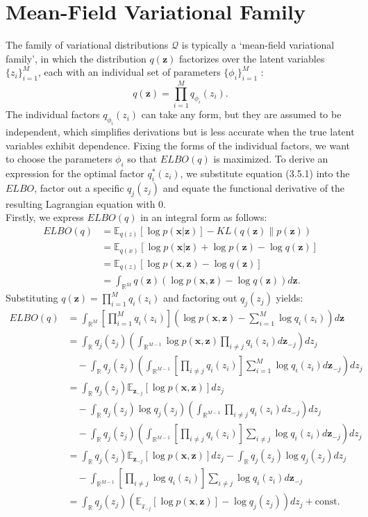 \documentclass[honours,12pt]{unswthesis}
\newcommand{\R}{\mathbb{R}}
\numberwithin{equation}{section}
\theoremstyle{definition}
\begin{document}
\section{Mean-Field Variational Family}
The family of variational distributions $\mathcal{Q}$ is typically a `mean-field variational family', in which the distribution $q(\bm{z})$ factorizes over the latent variables $\{z_i\}^M_{i=1}$, each with an individual set of parameters $\{\phi_i\}^M_{i=1}$ \citep{blei}:
\begin{equation}
q(\bm{z})=\prod^M_{i=1}q_{\phi_i}(z_i).
\end{equation}
The individual factors $q_{\phi_i}(z_i)$ can take any form, but they are assumed to be independent, which simplifies derivations but is less accurate when the true latent variables exhibit dependence. Fixing the forms of the individual factors, we want to choose the parameters $\phi_i$ so that $ELBO(q)$ is maximized. To derive an expression for the optimal factor $q_i^*(z_i)$, we substitute equation (3.5.1) into the $ELBO$, factor out a specific $q_j(z_j)$ and equate the functional derivative of the resulting Lagrangian equation with 0. \\
Firstly, we express $ELBO(q)$ in an integral form as follows:
\begin{align*}
ELBO(q)&= \mathbb{E}_{q(z)}[\log p(\bm{x}|\bm{z})]-KL(q(\bm{z})\|p(\bm{z}))\\
&= \mathbb{E}_{q(x)}[\log p(\bm{x}|\bm{z})+\log p(\bm{z})-\log q(\bm{z})]\\
&= \mathbb{E}_{q(z)}[\log p(\bm{x}, \bm{z})-\log q(\bm{z})]\\
&= \int_{\R^M}q(\bm{z})(\log p(\bm{x},\bm{z})-\log q(\bm{z}))d\bm{z}.
\end{align*}
Substituting $q(\bm{z})=\prod^M_{i=1}q_i(z_i)$ and factoring out $q_j(z_j)$ yields:
\begin{align}
ELBO(q)&= \int_{\R^M}\left[\prod^M_{i=1}q_i(z_i)\right]\left(\log p(\bm{x},\bm{z})-\sum_{i=1}^M\log q_i(z_i)\right)d\bm{z}\nonumber\\
&= \int_{\R}q_j(z_j)\left(\int_{\R^{M-1}}\log p(\bm{x},\bm{z})\prod_{i\neq j}q_i(z_i)d\bm{z}_{-j} \right) dz_j\nonumber\\
&\quad -\int_{\R}q_j(z_j)\left(\int_{\R^{M-1}}\left[\prod_{i\neq j}q_i(z_i)\right]\sum_{i=1}^M \log q_i(z_i)d\bm{z}_{-j}\right)dz_j\nonumber\\
&= \int_{\R}q_j(z_j)\mathbb{E}_{\bm{z}_{-j}}[\log p(\bm{x},\bm{z})]dz_j\nonumber\\
&\quad -\int_{\R}q_j(z_j)\log q_j(z_j)\left(\int_{\R^{M-1}}\prod_{i\neq j}q_i(z_i)dz_{-j}\right) dz_j\nonumber\\
&\quad -\int_{\R}q_j(z_j)\left(\int_{\R^{M-1}}\left[\prod_{i\neq j}q_i(z_i)\right]\sum_{i\neq j}\log q_i(z_i)d{\bm{z}_{-j}}\right)dz_j\nonumber\\
&= \int_\R q_j(z_j)\mathbb{E}_{\bm{z}_{-j}}[\log p(\bm{x},\bm{z})]dz_j-\int_\R q_j(z_j)\log q_j(z_j)dz_j\nonumber\\
&\quad -\int_{\R^{M-1}}\left[\prod_{i\neq j}\log q_i(z_i)\right]\sum_{i\neq j}\log q_i(z_i)d{\bm{z}_{-j}}
\\&= \int_{\R}q_j(z_j)\left(\mathbb{E}_{\mathcal{z}_{-j}}[\log p(\bm{x},\bm{z})]-\log q_j(z_j)\right)dz_j+\text{const}.
\end{align}
\end{document}
